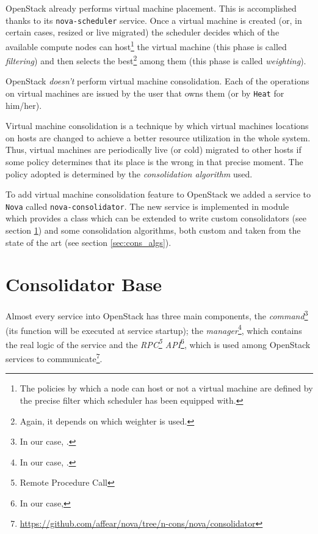 OpenStack already performs virtual machine placement. This is accomplished thanks to its \texttt{nova-scheduler} service. Once a virtual machine is created (or, in certain cases, resized or live migrated) the scheduler decides which of the available compute nodes can host\footnote{The policies by which a node can host or not a virtual machine are defined by the precise filter which scheduler has been equipped with.} the virtual machine (this phase is called \textit{filtering}) and then selects the best\footnote{Again, it depends on which weighter is used.} among them (this phase is called \textit{weighting}).

OpenStack \emph{doesn't} perform virtual machine consolidation. Each of the operations on virtual machines are issued by the user that owns them (or by \texttt{Heat} for him/her).

Virtual machine consolidation is a technique by which virtual machines locations on hosts are changed to achieve a better resource utilization in the whole system. Thus, virtual machines are periodically live (or cold) migrated to other hosts if some policy determines that its place is the wrong in that precise moment. The policy adopted is determined by the \emph{consolidation algorithm} used.

To add virtual machine consolidation feature to OpenStack we added a service to \texttt{Nova} called \texttt{nova-consolidator}. The new service is implemented in module  which provides a  class which can be extended to write custom consolidators (see section \ref{sec:cons_base}) and some consolidation algorithms, both custom and taken from the state of the art (see section \ref{sec:cons_algs}).

\section{Consolidator Base}
\label{sec:cons_base}
Almost every service into OpenStack has three main components, the \emph{command}\footnote{In our case, .} (its function  will be executed at service startup); the \emph{manager}\footnote{In our case, .}, which contains the real logic of the service and the \emph{RPC\footnote{Remote Procedure Call} API}\footnote{In our case, }, which is used among OpenStack services to communicate\footnote{\url{https://github.com/affear/nova/tree/n-cons/nova/consolidator}}.


